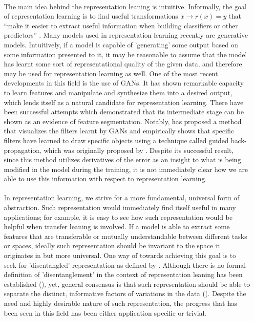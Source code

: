 \documentclass[11pt, letterpaper, oneside]{article}
\begin{document}
\paragraph{}
The main idea behind the representation leaning is intuitive. Informally, the goal of representation learning is to find useful transformations $x \rightarrow r(x) = y$ that “make it easier to extract useful information when building classifiers or other predictors” \cite{bengio_representation_2014}. Many models used in representation learning recently are generative models. Intuitively, if a model is capable of 'generating' some output based on some information presented to it, it may be reasonable to assume that the model has learnt some sort of representational quality of the given data, and therefore may be used for representation learning as well. One of the most recent developments in this field is the use of GANs. It has shown remarkable capacity to learn features and manipulate and synthesize them into a desired output, which lends itself as a natural candidate for representation learning. There have been successful attempts which demonstrated that its intermediate stage can be shown as an evidence of feature segmentation. Notably, \cite{radford_unsupervised_2016} has proposed a method that visualizes the filters learnt by GANs and empirically shows that specific filters have learned to draw specific objects using a technique called guided back-propagation, which was originally proposed by \cite{springenberg_striving_2015}. Despite its successful result, since this method utilizes derivatives of the error as an insight to what is being modified in the model during the training, it is not immediately clear how we are able to use this information with respect to representation learning.
\paragraph{}
In representation learning, we strive for a more fundamental, universal form of abstraction. Such representation would immediately find itself useful in many applications; for example, it is easy to see how such representation would be helpful when transfer leaning is involved. If a model is able to extract some features that are transferable or mutually understandable between different tasks or spaces, ideally such representation should be invariant to the space it originates in but more universal. One way of towards achieving this goal is to seek for 'disentangled' representation as defined by \cite{bengio_representation_2014}. Although there is no formal definition of 'disentanglement' in the context of representation leaning has been established (\cite{locatello_challenging_2019}), yet, general consensus is that such representation should be able to separate the distinct, informative factors of variations in the data (\cite{bengio_representation_2014}). Despite the need and highly desirable nature of such representation, the progress that has been seen in this field has been either application specific or trivial.
\end{document}
